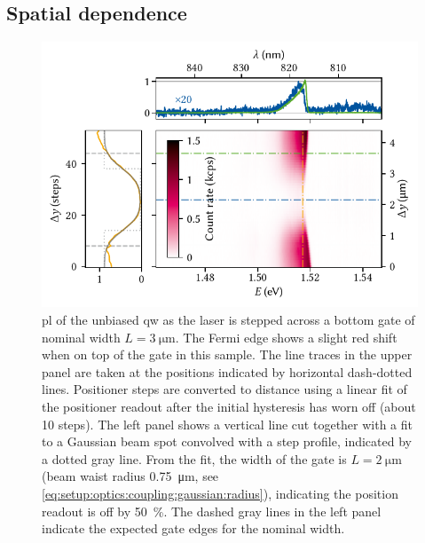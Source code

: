 \subsection{Spatial dependence}\label{subsec:exp:observations:pl:spatial}
\begin{figure}
    \centering
    \includegraphics{img/pdf/experiment/fig_F10_positioning}
    \caption[
        $V_{y}=\qty{30}{\volt}$
        \protect\newline
    ]{
        \Gls{pl} of the unbiased \gls{qw} as the laser is stepped across a bottom gate of nominal width $L = \qty{3}{\micro\meter}$.
        The Fermi edge shows a slight red shift when on top of the gate in this sample.
        The line traces in the upper panel are taken at the positions indicated by horizontal dash-dotted lines.
        Positioner steps are converted to distance using a linear fit of the positioner readout after the initial hysteresis has worn off (about \num{10} steps).
        The left panel shows a vertical line cut together with a fit to a Gaussian beam spot convolved with a step profile, indicated by a dotted gray line.
        From the fit, the width of the gate is $L = \qty{2}{\micro\meter}$ (beam waist radius \qty{0.75}{\micro\meter}, see \cref{eq:setup:optics:coupling:gaussian:radius}), indicating the position readout is off by \qty{50}{\percent}.
        The dashed gray lines in the left panel indicate the expected gate edges for the nominal width.
    }
    \label{fig:exp:pl:fig_F10_positioning}
\end{figure}


